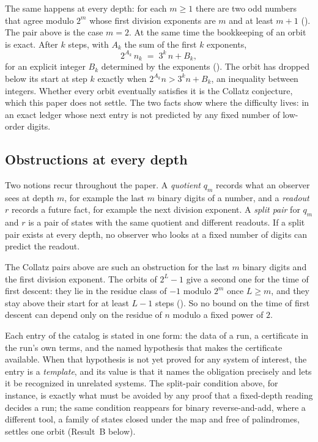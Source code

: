 The same happens at every depth: for each $m \ge 1$ there are two odd numbers that agree modulo
$2^m$ whose first division exponents are $m$ and at least $m+1$ (). The pair
above is the case $m = 2$. At the same time the bookkeeping of an orbit is exact. After $k$ steps,
with $A_k$ the sum of the first $k$ exponents,
\[
  2^{A_k}\, n_k \;=\; 3^k\, n + B_k ,
\]
for an explicit integer $B_k$ determined by the exponents (). The orbit has
dropped below its start at step $k$ exactly when $2^{A_k} n > 3^k n + B_k$, an inequality between
integers. Whether every orbit eventually satisfies it is the Collatz conjecture, which this paper
does not settle. The two facts show where the difficulty lives: in an exact ledger whose next entry
is not predicted by any fixed number of low-order digits.

\subsection{Obstructions at every depth}\label{sec:intro-contribution}

Two notions recur throughout the paper. A \emph{quotient} $q_m$ records what an observer sees at
depth $m$, for example the last $m$ binary digits of a number, and a \emph{readout} $r$ records a
future fact, for example the next division exponent. A \emph{split pair} for $q_m$ and $r$ is a pair
of states with the same quotient and different readouts. If a split pair exists at every depth, no
observer who looks at a fixed number of digits can predict the readout.

The Collatz pairs above are such an obstruction for the last $m$ binary digits and the first
division exponent. The orbits of $2^L - 1$ give a second one for the time of first descent: they lie
in the residue class of $-1$ modulo $2^m$ once $L \ge m$, and they stay above their start for at
least $L - 1$ steps (). So no bound on the time of first descent can depend
only on the residue of $n$ modulo a fixed power of $2$.

Each entry of the catalog is stated in one form: the data of a run, a certificate in the run's own
terms, and the named hypothesis that makes the certificate available. When that hypothesis is not
yet proved for any system of interest, the entry is a \emph{template}, and its value is that it
names the obligation precisely and lets it be recognized in unrelated systems. The split-pair
condition above, for instance, is exactly what must be avoided by any proof that a fixed-depth
reading decides a run; the same condition reappears for binary reverse-and-add, where a different
tool, a family of states closed under the map and free of palindromes, settles one orbit
(Result~B below).

